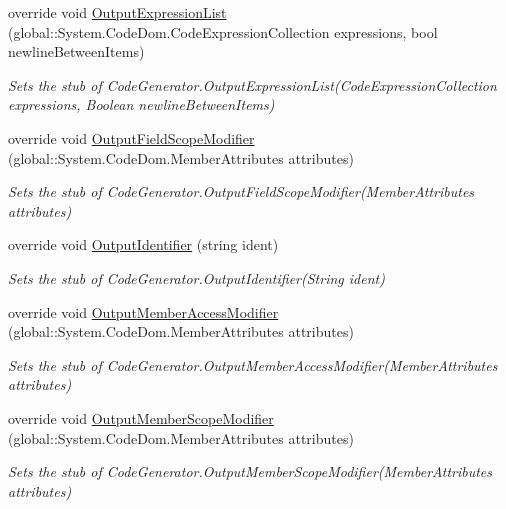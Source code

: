 \begin{DoxyCompactItemize}
override void \hyperlink{class_system_1_1_code_dom_1_1_compiler_1_1_fakes_1_1_stub_code_compiler_ada49062bad39c729388d3c637583b0d4}{Output\-Expression\-List} (global\-::\-System.\-Code\-Dom.\-Code\-Expression\-Collection expressions, bool newline\-Between\-Items)
\begin{DoxyCompactList}\small\item\em Sets the stub of Code\-Generator.\-Output\-Expression\-List(\-Code\-Expression\-Collection expressions, Boolean newline\-Between\-Items)\end{DoxyCompactList}\item 
override void \hyperlink{class_system_1_1_code_dom_1_1_compiler_1_1_fakes_1_1_stub_code_compiler_aa2ee6eb77d26296944046cff5a476dd4}{Output\-Field\-Scope\-Modifier} (global\-::\-System.\-Code\-Dom.\-Member\-Attributes attributes)
\begin{DoxyCompactList}\small\item\em Sets the stub of Code\-Generator.\-Output\-Field\-Scope\-Modifier(\-Member\-Attributes attributes)\end{DoxyCompactList}\item 
override void \hyperlink{class_system_1_1_code_dom_1_1_compiler_1_1_fakes_1_1_stub_code_compiler_af40c979bb5727162095e365d22c47c88}{Output\-Identifier} (string ident)
\begin{DoxyCompactList}\small\item\em Sets the stub of Code\-Generator.\-Output\-Identifier(\-String ident)\end{DoxyCompactList}\item 
override void \hyperlink{class_system_1_1_code_dom_1_1_compiler_1_1_fakes_1_1_stub_code_compiler_a95f5898d1ecc52c8ad7f08c7e60e544a}{Output\-Member\-Access\-Modifier} (global\-::\-System.\-Code\-Dom.\-Member\-Attributes attributes)
\begin{DoxyCompactList}\small\item\em Sets the stub of Code\-Generator.\-Output\-Member\-Access\-Modifier(\-Member\-Attributes attributes)\end{DoxyCompactList}\item 
override void \hyperlink{class_system_1_1_code_dom_1_1_compiler_1_1_fakes_1_1_stub_code_compiler_acf998fec3d665b69a4984c28c65231d2}{Output\-Member\-Scope\-Modifier} (global\-::\-System.\-Code\-Dom.\-Member\-Attributes attributes)
\begin{DoxyCompactList}\small\item\em Sets the stub of Code\-Generator.\-Output\-Member\-Scope\-Modifier(\-Member\-Attributes attributes)\end{DoxyCompactList}\item 

\end{DoxyCompactItemize}
